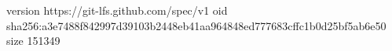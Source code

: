 version https://git-lfs.github.com/spec/v1
oid sha256:a3e7488f842997d39103b2448eb41aa964848ed777683cffc1b0d25bf5ab6e50
size 151349
